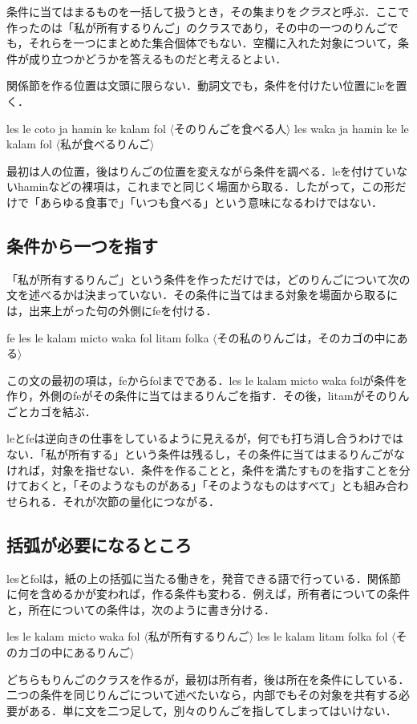 \documentclass[b5paper, 10pt]{ltjsarticle}
\newcommand{\ko}[1]{\textsf{#1}}
\newcommand{\sentence}[1]{$\langle$#1$\rangle$}
\begin{document}
条件に当てはまるものを一括して扱うとき，その集まりを\emph{クラス}と呼ぶ．ここで作ったのは「私が所有するりんご」のクラスであり，その中の一つのりんごでも，それらを一つにまとめた集合個体でもない．空欄に入れた対象について，条件が成り立つかどうかを答えるものだと考えるとよい．

関係節を作る位置は文頭に限らない．動詞文でも，条件を付けたい位置に\ko{le}を置く．
\begin{exe}
    \ex \ko{les le coto ja hamin ke kalam fol}
    \glt \sentence{そのりんごを食べる人}
    \ex \ko{les waka ja hamin ke le kalam fol}
    \glt \sentence{私が食べるりんご}
\end{exe}
最初は人の位置，後はりんごの位置を変えながら条件を調べる．\ko{le}を付けていない\ko{hamin}などの裸項は，これまでと同じく場面から取る．したがって，この形だけで「あらゆる食事で」「いつも食べる」という意味になるわけではない．

\subsection{条件から一つを指す}
「私が所有するりんご」という条件を作っただけでは，どのりんごについて次の文を述べるかは決まっていない．その条件に当てはまる対象を場面から取るには，出来上がった句の外側に\ko{fe}を付ける．
\begin{exe}
    \ex \ko{fe les le kalam micto waka fol litam folka}
    \glt \sentence{その私のりんごは，そのカゴの中にある}
\end{exe}
この文の最初の項は，\ko{fe}から\ko{fol}までである．\ko{les le kalam micto waka fol}が条件を作り，外側の\ko{fe}がその条件に当てはまるりんごを指す．その後，\ko{litam}がそのりんごとカゴを結ぶ．

\ko{le}と\ko{fe}は逆向きの仕事をしているように見えるが，何でも打ち消し合うわけではない．「私が所有する」という条件は残るし，その条件に当てはまるりんごがなければ，対象を指せない．条件を作ることと，条件を満たすものを指すことを分けておくと，「そのようなものがある」「そのようなものはすべて」とも組み合わせられる．それが次節の量化につながる．

\subsection{括弧が必要になるところ}
\ko{les}と\ko{fol}は，紙の上の括弧に当たる働きを，発音できる語で行っている．関係節に何を含めるかが変われば，作る条件も変わる．例えば，所有者についての条件と，所在についての条件は，次のように書き分ける．
\begin{exe}
    \ex \ko{les le kalam micto waka fol}
    \glt \sentence{私が所有するりんご}
    \ex \ko{les le kalam litam folka fol}
    \glt \sentence{そのカゴの中にあるりんご}
\end{exe}
どちらもりんごのクラスを作るが，最初は所有者，後は所在を条件にしている．二つの条件を同じりんごについて述べたいなら，内部でもその対象を共有する必要がある．単に文を二つ足して，別々のりんごを指してしまってはいけない．
\end{document}
